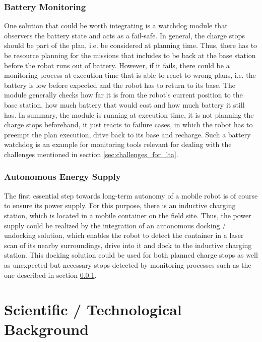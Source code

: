 \documentclass[english, master, expose, utf8]{base/thesis_KBS}
\begin{document}
\subsubsection{Battery Monitoring}
\label{sec:battery_monitoring}

One solution that could be worth integrating is a watchdog module that observers the battery state and acts as a fail-safe. In general, the charge stops should
be part of the plan, i.e. be considered at planning time. Thus, there has to be resource planning for the missions that includes to be back at the base station before
the robot runs out of battery. However, if it fails, there could be a monitoring process at execution time that is able to react to wrong plans, i.e. the battery is
low before expected and the robot has to return to its base. The module generally checks how far it is from the robot's current position to the base station, how much
battery that would cost and how much battery it still has. In summary, the module is running at execution time, it is not planning the charge stops beforehand,
it just reacts to failure cases, in which the robot has to preempt the plan execution, drive back to its base and recharge.
Such a battery watchdog is an example for monitoring tools relevant for dealing with the challenges mentioned in section \ref{sec:challenges_for_lta}.

\subsubsection{Autonomous Energy Supply}

The first essential step towards long-term autonomy of a mobile robot is of course to ensure its power supply.
For this purpose, there is an inductive charging station, which is located in a mobile container on the field site.
Thus, the power supply could be realized by the integration of an autonomous docking / undocking solution, which enables the robot to detect
the container in a laser scan of its nearby surroundings, drive into it and dock to the inductive charging station.
This docking solution could be used for both planned charge stops as well as unexpected but necessary stops detected by monitoring processes such
as the one described in section \ref{sec:battery_monitoring}.

\section{Scientific / Technological Background}
\label{sec:scientific_bg}
\end{document}
